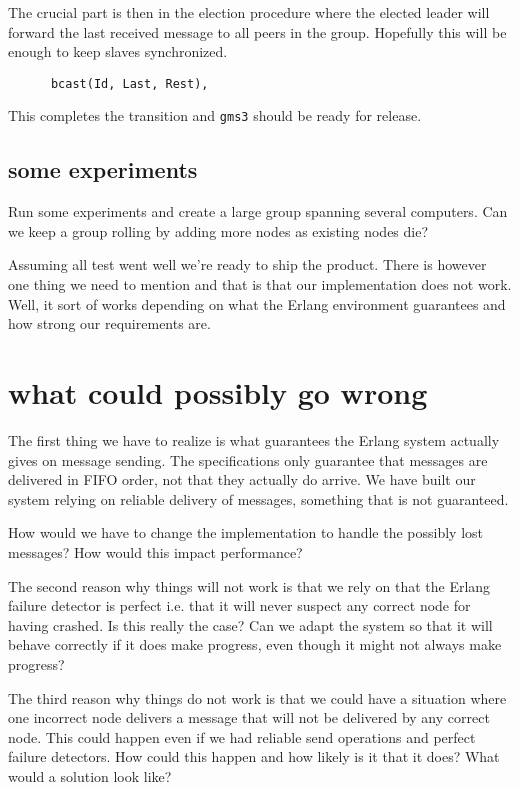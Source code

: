 \documentclass[a4paper,11pt]{article}
\begin{document}
The crucial part is then in the election procedure where the elected
leader will forward the last received message to all peers in the
group. Hopefully this will be enough to keep slaves synchronized.

\begin{verbatim}
      bcast(Id, Last, Rest),
\end{verbatim}

This completes the transition and {\tt gms3} should be ready for
release. 

\subsection{some experiments}

Run some experiments and create a large group spanning several
computers. Can we keep a group rolling by adding more nodes as
existing nodes die?

Assuming all test went well we're ready to ship the product. There is
however one thing we need to mention and that is that our
implementation does not work. Well, it sort of works depending on what
the Erlang environment guarantees and how strong our requirements are.

\section{what could possibly go wrong}

The first thing we have to realize is what guarantees the Erlang
system actually gives on message sending. The specifications only
guarantee that messages are delivered in FIFO order, not that they
actually do arrive. We have built our system relying on reliable
delivery of messages, something that is not guaranteed.

How would we have to change the implementation to handle the possibly
lost messages? How would this impact performance?

The second reason why things will not work is that we rely on that the
Erlang failure detector is perfect i.e. that it will never suspect any
correct node for having crashed. Is this really the case? Can we adapt
the system so that it will behave correctly if it does make progress,
even though it might not always make progress?

The third reason why things do not work is that we could have a
situation where one incorrect node delivers a message that will not be delivered
by any correct node. This could happen even if we had reliable send
operations and perfect failure detectors.  How could this happen and
how likely is it that it does?  What would a solution look like?
\end{document}
